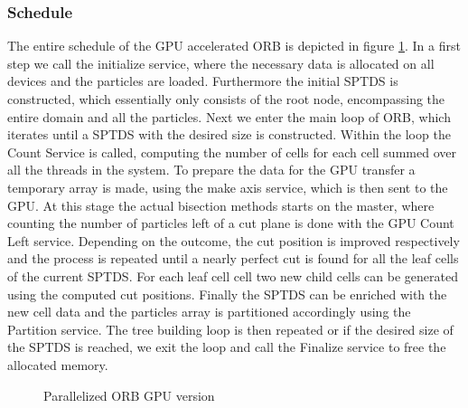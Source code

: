 \documentclass[]{article}
\begin{document}
\subsubsection{Schedule}

The entire schedule of the GPU accelerated ORB is depicted in figure \ref{fig:orbgpup}. In a first step we call the initialize service, where the necessary data is allocated on all devices and the particles are loaded. Furthermore the initial SPTDS is constructed, which essentially only consists of the root node, encompassing the entire domain and all the particles. Next we enter the main loop of ORB, which iterates until a SPTDS with the desired size is constructed. Within the loop the Count Service is called, computing the number of cells for each cell summed over all the threads in the system. To prepare the data for the GPU transfer a temporary array is made, using the make axis service, which is then sent to the GPU. 
At this stage the actual bisection methods starts on the master, where counting the number of particles left of a cut plane is done with the GPU Count Left service. Depending on the outcome, the cut position is improved respectively and the process is repeated until a nearly perfect cut is found for all the leaf cells of the current SPTDS. For each leaf cell cell two new child cells can be generated using the computed cut positions. Finally the SPTDS can be enriched with the new cell data and the particles array is partitioned accordingly using the Partition service. 
The tree building loop is then repeated or if the desired size of the SPTDS is reached, we exit the loop and call the Finalize service to free the allocated memory.


\begin{figure}[H]
	\begin{center}
	\end{center}
	\caption{Parallelized ORB GPU version}
	\label{fig:orbgpup}
\end{figure}
\end{document}
